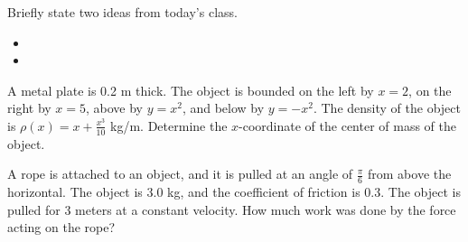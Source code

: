 \postClass

\begin{problem}
\item Briefly state two ideas from today's class.
  \begin{itemize}
  \item 
  \item 
  \end{itemize}
\item A metal plate is 0.2 m thick. The object is bounded on the left by
  $x=2$, on the right by $x=5$, above by $y=x^2$, and below by
  $y=-x^2$. The density of the object is $\rho(x)=x+\frac{x^3}{10}$
  kg/m. Determine the $x$-coordinate of the center of mass of the
  object.
    \vfill
    \clearpage
\end{problem}



\begin{problem}
\item A rope is attached to an object, and it is pulled at an angle of
  $\frac{\pi}{6}$ from above the horizontal. The object is 3.0 kg, and
  the coefficient of friction is 0.3. The object is pulled for 3
  meters at a constant velocity. How much work was done by the force
  acting on the rope?

  \vfill
\end{problem}


